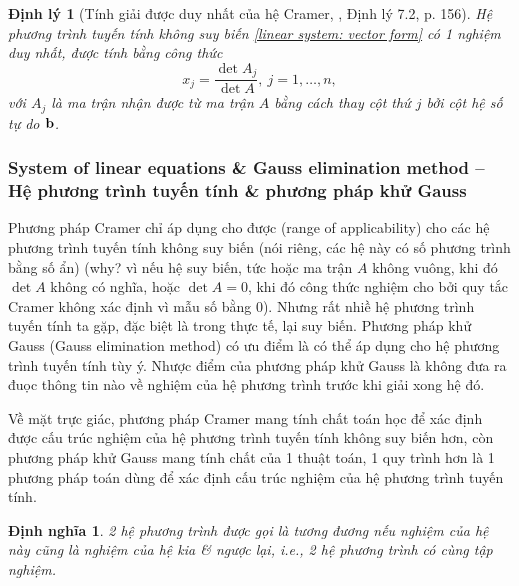 \documentclass{article}
\newtheorem{dinhly}{Định lý}
\newtheorem{dinhnghia}{Định nghĩa}
\begin{document}
\begin{dinhly}[Tính giải được duy nhất của hệ Cramer, \cite{Hung_linear_algebra}, Định lý 7.2, p. 156]
	Hệ phương trình tuyến tính không suy biến \eqref{linear system: vector form} có 1 nghiệm duy nhất, được tính bằng công thức
	\begin{equation*}
		x_j = \frac{\det A_j}{\det A},\ j = 1,\ldots,n,
	\end{equation*}
	với $A_j$ là ma trận nhận được từ ma trận $A$ bằng cách thay cột thứ $j$ bởi cột hệ số tự do ${\bf b}$.
\end{dinhly}

\subsubsection{System of linear equations \& Gauss elimination method -- Hệ phương trình tuyến tính \& phương pháp khử Gauss}
Phương pháp Cramer chỉ áp dụng cho được (range of applicability) cho các hệ phương trình tuyến tính không suy biến (nói riêng, các hệ này có số phương trình bằng số ẩn) (why? vì nếu hệ suy biến, tức hoặc ma trận $A$ không vuông, khi đó $\det A$ không có nghĩa, hoặc $\det A = 0$, khi đó công thức nghiệm cho bởi quy tắc Cramer không xác định vì mẫu số bằng 0). Nhưng rất nhiề hệ phương trình tuyến tính ta gặp, đặc biệt là trong thực tế, lại suy biến. Phương pháp khử Gauss (Gauss elimination method) có ưu điểm là có thể áp dụng cho hệ phương trình tuyến tính tùy ý. Nhược điểm của phương pháp khử Gauss là không đưa ra đuọc thông tin nào về nghiệm của hệ phương trình trước khi giải xong hệ đó.

Về mặt trực giác, phương pháp Cramer mang tính chất toán học để xác định được cấu trúc nghiệm của hệ phương trình tuyến tính không suy biến hơn, còn phương pháp khử Gauss mang tính chất của 1 thuật toán, 1 quy trình hơn là 1 phương pháp toán dùng để xác định cấu trúc nghiệm của hệ phương trình tuyến tính.

\begin{dinhnghia}
	2 hệ phương trình được gọi là {\rm tương đương} nếu nghiệm của hệ này cũng là nghiệm của hệ kia \& ngược lại, i.e., 2 hệ phương trình có cùng tập nghiệm.
\end{dinhnghia}
\end{document}
